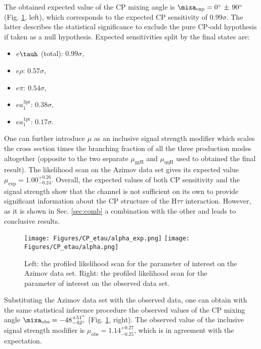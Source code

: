 The obtained expected value of the CP mixing angle is $\mixa_\text{exp} = 0^\circ \, \pm \, 90^\circ$ (Fig. \ref{fig:mixa}, left), which corresponds to the expected CP sensitivity of $0.99 \sigma$. The latter describes the statistical significance to exclude the pure CP-odd hypothesis if taken as a null hypothesis. Expected sensitivities split by the final states are:
\begin{itemize}
    \item $e\tauh$ (total): $0.99\sigma$, 
    \item $e\rho$: $0.57\sigma$,
    \item $e\pi$: $0.54\sigma$, 
    \item $ea_1^\text{3pr}$: $0.38\sigma$, 
    \item $ea_1^\text{1pr}$: $0.17\sigma$. 
\end{itemize}


One can further introduce $\mu$ as an inclusive signal strength modifier which scales the cross section times the \htt branching fraction of all the three production modes altogether (opposite to the two separate $\mu_\text{ggH}$ and $\mu_\text{qqH}$ used to obtained the final result). The likelihood scan on the Azimov data set gives its expected value $\mu_\text{exp} = 1.00^{+0.26}_{-0.24}$. Overall, the expected values of both CP sensitivity and the signal strength show that the \et channel is not sufficient on its own to provide significant information about the CP structure of the $\text{H}\tau\tau$ interaction. However, as it is shown in Sec. \ref{sec:comb} a combination with the other \mt and \tata leads to conclusive results.

\begin{figure}[H]
    \centering
    \texttt{[image: Figures/CP\_etau/alpha\_exp.png]}
    \texttt{[image: Figures/CP\_etau/alpha.png]}
    \caption{Left: the profiled likelihood scan for the \mixa parameter of interest on the Azimov data set. Right: the profiled likelihood scan for the \mixa parameter of interest on the observed data set.}
    \label{fig:mixa}
\end{figure}

Substituting the Azimov data set with the observed data, one can obtain with the same statistical inference procedure the observed values of the CP mixing angle $\mixa_\text{obs} = -48^{+51^\circ}_{-42^\circ}$ (Fig. \ref{fig:mixa}, right). The observed value of the inclusive signal strength modifier is $\mu_\text{obs} = 1.14^{+0.27}_{-0.25}$, which is in agreement with the expectation. 

